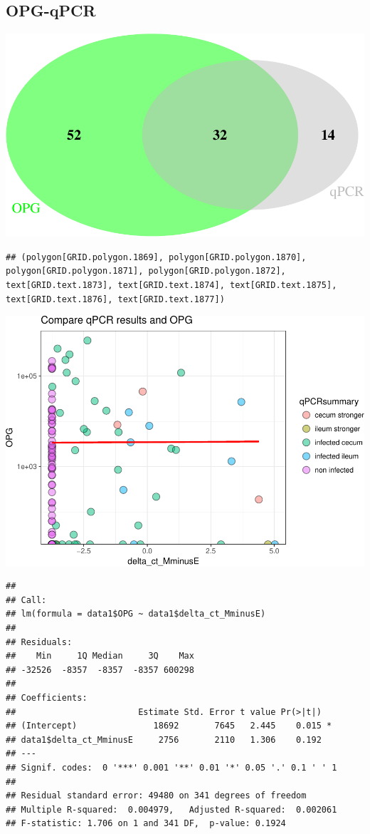 \documentclass[]{article}
\begin{document}
\subsection{OPG-qPCR}\label{opg-qpcr-1}

\includegraphics{Data_Analysis_Alice_files/figure-latex/opgpcrVenn_3.75-1.pdf}

\begin{verbatim}
## (polygon[GRID.polygon.1869], polygon[GRID.polygon.1870], polygon[GRID.polygon.1871], polygon[GRID.polygon.1872], text[GRID.text.1873], text[GRID.text.1874], text[GRID.text.1875], text[GRID.text.1876], text[GRID.text.1877])
\end{verbatim}

\includegraphics{Data_Analysis_Alice_files/figure-latex/opgqpcr_3.75-1.pdf}

\begin{verbatim}
## 
## Call:
## lm(formula = data1$OPG ~ data1$delta_ct_MminusE)
## 
## Residuals:
##    Min     1Q Median     3Q    Max 
## -32526  -8357  -8357  -8357 600298 
## 
## Coefficients:
##                        Estimate Std. Error t value Pr(>|t|)  
## (Intercept)               18692       7645   2.445    0.015 *
## data1$delta_ct_MminusE     2756       2110   1.306    0.192  
## ---
## Signif. codes:  0 '***' 0.001 '**' 0.01 '*' 0.05 '.' 0.1 ' ' 1
## 
## Residual standard error: 49480 on 341 degrees of freedom
## Multiple R-squared:  0.004979,   Adjusted R-squared:  0.002061 
## F-statistic: 1.706 on 1 and 341 DF,  p-value: 0.1924
\end{verbatim}
\end{document}
